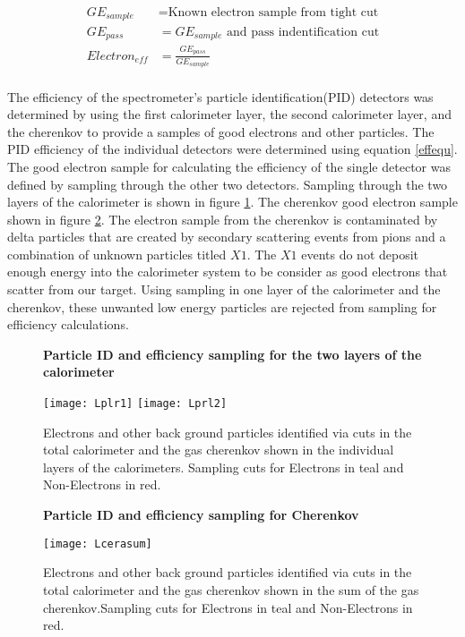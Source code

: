 \begin{equation}\label{effequ}
\begin{split}
		GE_{sample} & = \textrm{Known electron sample from tight cut}  \\
	      GE_{pass} & = \textrm{$GE_{sample}$ and pass indentification cut} \\
	Electron_{eff}  & = \frac{ GE_{pass} } { GE_{sample} } 
\end{split}
\end{equation}
\paragraph{}The efficiency of the spectrometer's particle identification(PID) detectors was determined by using the first calorimeter layer, the second calorimeter layer, and the cherenkov to provide a samples of good electrons and other particles. The PID efficiency of the individual detectors were determined using equation \ref{effequ}. The good electron sample for calculating the efficiency of the single detector was defined by sampling through the other two detectors. Sampling through the two layers of the calorimeter is shown in figure \ref{Prl1Prl2}. The cherenkov good electron sample shown in figure \ref{cersam}. The electron sample from the cherenkov is contaminated by delta particles that are created by secondary scattering events from pions and a combination of unknown particles titled $X1$. The $X1$ events do not deposit enough energy into the calorimeter system to be consider as good electrons that scatter from our target. Using sampling in one layer of the calorimeter and the cherenkov, these unwanted low energy particles are rejected from sampling for efficiency calculations. 


\begin{figure}[]
{\centering
\textbf{Particle ID and efficiency sampling for the two layers of the calorimeter }\par\medskip}
\texttt{[image: Lplr1]}
\texttt{[image: Lprl2]}
\caption{Electrons and other back ground particles identified via cuts in the total calorimeter and the gas cherenkov shown in the individual layers of the calorimeters. Sampling cuts for Electrons in teal and Non-Electrons in red.}
\label{Prl1Prl2}
\end{figure}

\begin{figure}[]
{\centering
\textbf{Particle ID and efficiency sampling for Cherenkov }\par\medskip}
\texttt{[image: Lcerasum]}
\caption{Electrons and other back ground particles identified via cuts in the total calorimeter and the gas cherenkov shown in the sum of the gas cherenkov.Sampling cuts for Electrons in teal and Non-Electrons in red.}
\label{cersam}
\end{figure}
